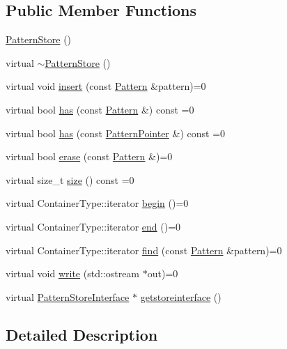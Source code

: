 \subsection*{Public Member Functions}
\begin{DoxyCompactItemize}
\item 
\hyperlink{classPatternStore_ad767b084f6fa6e96b2cf011d74c6a691}{Pattern\+Store} ()
\item 
virtual \hyperlink{classPatternStore_a867df32d9a0656631f730c959be89b3b}{$\sim$\+Pattern\+Store} ()
\item 
virtual void \hyperlink{classPatternStore_a22e091d80efb8182ac49cf6b225f0aa1}{insert} (const \hyperlink{classPattern}{Pattern} \&pattern)=0
\item 
virtual bool \hyperlink{classPatternStore_abdebd74a21912e436531a64fe8b09a6c}{has} (const \hyperlink{classPattern}{Pattern} \&) const  =0
\item 
virtual bool \hyperlink{classPatternStore_ad9c8afcf7b7da6acd257c52336751bd2}{has} (const \hyperlink{classPatternPointer}{Pattern\+Pointer} \&) const  =0
\item 
virtual bool \hyperlink{classPatternStore_ad8b6d8e1eba917d45e8667ace70f1b1e}{erase} (const \hyperlink{classPattern}{Pattern} \&)=0
\item 
virtual size\+\_\+t \hyperlink{classPatternStore_a586751d731a509da5865d5863d56a8e4}{size} () const  =0
\item 
virtual Container\+Type\+::iterator \hyperlink{classPatternStore_a9dfc403ac576e1904f4ec326fec1adaa}{begin} ()=0
\item 
virtual Container\+Type\+::iterator \hyperlink{classPatternStore_aed5adf38c88543123f705e44b4cddfee}{end} ()=0
\item 
virtual Container\+Type\+::iterator \hyperlink{classPatternStore_ac8cf692af151c3aad6aea81fa5748957}{find} (const \hyperlink{classPattern}{Pattern} \&pattern)=0
\item 
virtual void \hyperlink{classPatternStore_ac491b99964c6b4c99f5c40519d0c8ccc}{write} (std\+::ostream $\ast$out)=0
\item 
virtual \hyperlink{classPatternStoreInterface}{Pattern\+Store\+Interface} $\ast$ \hyperlink{classPatternStore_a993fa155a8361ff87a526de81dbe6d6d}{getstoreinterface} ()
\end{DoxyCompactItemize}


\subsection{Detailed Description}
